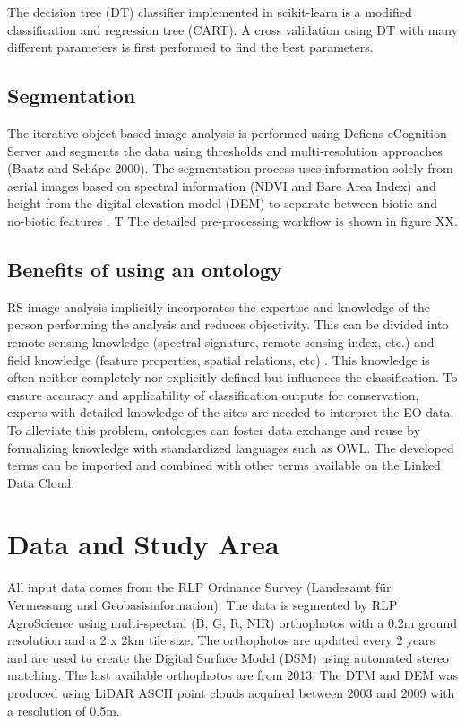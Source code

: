 \documentclass[authoryear, review,12pt,number]{elsarticle}
\begin{document}
The decision tree (DT) classifier implemented in scikit-learn is a modified
classification and regression tree (CART)\citep{scikit-learn}. A cross
validation using DT with many different parameters is first performed to find
the best parameters. 

\subsection{Segmentation} The iterative object-based image analysis is
performed using Defiens eCognition Server and segments the data using
thresholds and multi-resolution approaches (Baatz and Sch\'ape 2000). The
segmentation process uses information solely from aerial images based on
spectral information (NDVI and Bare Area Index) and height from the digital
elevation model (DEM) to separate between biotic and no-biotic features
\citep{Tintrup2015}. T The detailed pre-processing workflow is shown in figure
XX.
\subsection{Benefits of using an ontology}
RS image analysis implicitly incorporates the expertise and
knowledge of the person performing the analysis and reduces objectivity. This
can be divided into remote sensing knowledge (spectral signature, remote
sensing index, etc.) and field knowledge (feature properties, spatial
relations, etc) \citep{Andres2013a}. This knowledge is often neither completely
nor explicitly defined but influences the classification. To ensure accuracy and
applicability of classification outputs for conservation, experts with detailed
knowledge of the sites are needed to interpret the EO data. To alleviate this
problem, ontologies can foster data exchange and reuse by formalizing knowledge
with standardized languages such as OWL. The developed terms can be imported and
combined with other terms available on the Linked Data Cloud. 
\section{Data and Study Area}
All input data comes from the RLP Ordnance Survey (Landesamt f\"ur Vermessung 
und Geobasisinformation). The data is segmented by RLP AgroScience using
multi-spectral (B, G, R, NIR) orthophotos with a 0.2m ground resolution and a
2 x 2km tile size. The orthophotos are updated every 2 years and are used to
create the Digital Surface Model (DSM) using automated stereo matching. The
last available orthophotos are from 2013. The DTM and
DEM was produced using LiDAR ASCII point clouds acquired between 2003 and 2009
with a resolution of 0.5m.\\
\end{document}
